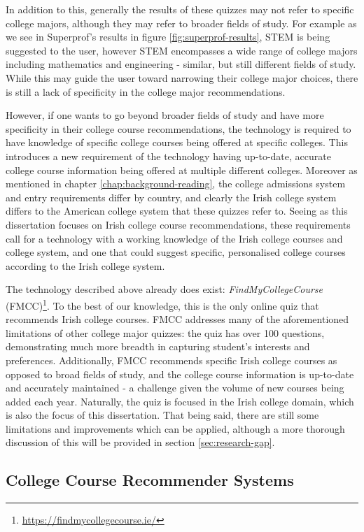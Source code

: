 In addition to this, generally the results of these quizzes may not refer to specific college majors, 
although they may refer to broader fields of study.
For example as we see in Superprof's results in figure \ref{fig:superprof-results}, STEM is being suggested to the user,
however STEM encompasses a wide range of college majors including mathematics and engineering - similar, but still different fields of study.
While this may guide the user toward narrowing their college major choices, 
there is still a lack of specificity in the college major recommendations.

However, if one wants to go beyond broader fields of study and have more specificity in their college course recommendations,
the technology is required to have knowledge of specific college courses being offered at specific colleges.
This introduces a new requirement of the technology having up-to-date, accurate college course information being offered at multiple different colleges.
Moreover as mentioned in chapter \ref{chap:background-reading}, the college admissions system and entry requirements differ by country,
and clearly the Irish college system differs to the American college system that these quizzes refer to.
Seeing as this dissertation focuses on Irish college course recommendations, 
these requirements call for a technology with a working knowledge of the Irish college courses and college system,
and one that could suggest specific, personalised college courses according to the Irish college system.

The technology described above already does exist: \emph{FindMyCollegeCourse} (FMCC)\footnote{\url{https://findmycollegecourse.ie/}}.
To the best of our knowledge, this is the only online quiz that recommends Irish college courses.
FMCC addresses many of the aforementioned limitations of other college major quizzes:
the quiz has over 100 questions, demonstrating much more breadth in capturing student's interests and preferences.
Additionally, FMCC recommends specific Irish college courses as opposed to broad fields of study,
and the college course information is up-to-date and accurately maintained - a challenge given the volume of new courses being added each year.
Naturally, the quiz is focused in the Irish college domain, which is also the focus of this dissertation.
That being said, there are still some limitations and improvements which can be applied, although a more thorough discussion of this 
will be provided in section \ref{sec:research-gap}.

\subsection{College Course Recommender Systems}

